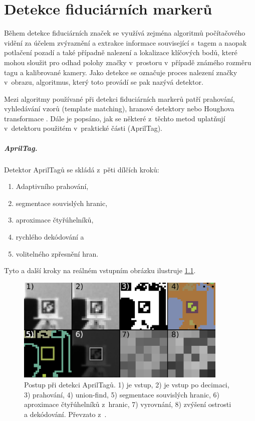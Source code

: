 \chapter{Detekce fiduciárních markerů} \label{chap:detection}
  Během detekce fiduciárních značek se využívá zejména algoritmů počítačového vidění za účelem zvýraznění a extrakce informace související s~tagem a naopak potlačení pozadí a také případně nalezení a lokalizace klíčových bodů, které mohou sloužit pro odhad polohy značky v~prostoru v~případě známého rozměru tagu a kalibrované kamery. Jako detekce se označuje proces nalezení značky v~obrazu, algoritmus, který toto provádí se pak nazývá detektor.

  Mezi algoritmy používané při detekci fiduciárních markerů patří prahování, vyhledávání vzorů (template matching), hranové detektory \cite{apriltag2} nebo Houghova transformace \cite{Shabalina2019}. Dále je popsáno, jak se některé z~těchto metod uplatňují v~detektoru použitém v~praktické části (AprilTag).

  \paragraph{AprilTag.} Detektor AprilTagů se skládá z~pěti dílčích kroků: 
  \begin{enumerate}
    \item Adaptivního prahování,
    \item segmentace souvislých hranic,
    \item aproximace čtyřúhelníků,
    \item rychlého dekódování a
    \item volitelného zpřesnění hran.
  \end{enumerate}
  Tyto a další kroky na reálném vstupním obrázku ilustruje \cref{fig:apriltagAlg}.
\begin{figure}
  \centering
  \includegraphics[width=0.9\textwidth]{img/detection/apriltag_alg.png}
  \caption[Postup při detekci AprilTagů]{Postup při detekci AprilTagů. 1) je vstup, 2) je vstup po decimaci, 3) prahování, 4) union-find, 5) segmentace souvislých hranic, 6) aproximace čtyřúhelníků z~hranic, 7) vyrovnání, 8) zvýšení ostrosti a dekódování. Převzato z~\cite{apriltag3}.}
  \label{fig:apriltagAlg}
\end{figure}


